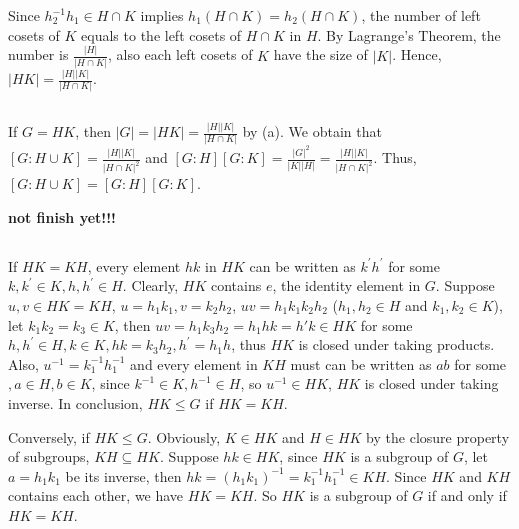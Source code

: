 \documentclass[12pt]{article}
\begin{document}
Since $h_2^{-1}h_1\in H\cap K$ implies $h_1(H\cap K)=h_2(H\cap K)$, the number of left cosets of $K$ equals to the left cosets of $H\cap K$ in $H$. By Lagrange's Theorem, the number is $\frac{|H|}{|H\cap K|}$, also each left cosets of $K$ have the size of $|K|$. Hence, $|HK|=\frac{|H||K|}{|H\cap K|}$.
\subsection{}
If $G=HK$, then $|G|=|HK|=\frac{|H||K|}{|H\cap K|}$ by (a). We obtain that $[G:H\cup K]=\frac{|H||K|}{|H\cap K|^2}$ and $[G:H][G:K]=\frac{|G|^2}{|K||H|}=\frac{|H||K|}{|H\cap K|^2}$. Thus, $[G:H\cup K]=[G:H][G:K]$.

\textbf{not finish yet!!!}
\subsection{}
If $HK=KH$, every element $hk$ in $HK$ can be written as $k^{'}h^{'}$ for some $k,k^{'}\in K,h,h^{'}\in H$. Clearly, $HK$ contains $e$, the identity element in $G$. Suppose $u,v\in HK=KH$, $u=h_1k_1, v=k_2h_2$, $uv=h_1k_1k_2h_2$ ($h_1,h_2\in H$ and $k_1,k_2\in K$), let $k_1k_2=k_3\in K$, then $uv=h_1k_3h_2=h_1hk=h'k\in HK$ for some $h,h^{'}\in H, k\in K,hk=k_3h_2, h^{'}=h_1h$, thus $HK$ is closed under taking products. Also, $u^{-1}=k_1^{-1}h_1^{-1}$ and every element in $KH$ must can be written as $ab$ for some $,a\in H,b\in K$, since $k^{-1}\in K,h^{-1}\in H$, so $u^{-1}\in HK$, $HK$ is closed under taking inverse. In conclusion, $HK\le G$ if $HK=KH$.

Conversely, if $HK\le G$. Obviously, $K\in HK$ and $H\in HK$ by the closure property of subgroups, $KH\subseteq HK$. Suppose $hk\in HK$, since $HK$ is a subgroup of $G$, let $a=h_1k_1$ be its inverse, then $hk=(h_1k_1)^{-1}=k_1^{-1}h_1^{-1}\in KH$. Since $HK$ and $KH$ contains each other, we have $HK=KH$. So $HK$ is a subgroup of $G$ if and only if $HK=KH$.

\subsection{}

\section{}
\end{document}
